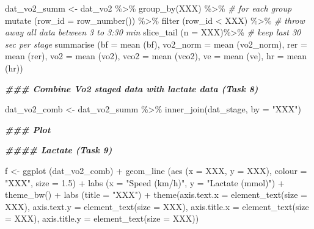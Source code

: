 \documentclass[
]{book}
\newenvironment{Shaded}{\begin{snugshade}}{\end{snugshade}}
\newcommand{\AttributeTok}[1]{\textcolor[rgb]{0.77,0.63,0.00}{#1}}
\newcommand{\CommentTok}[1]{\textcolor[rgb]{0.56,0.35,0.01}{\textit{#1}}}
\newcommand{\DocumentationTok}[1]{\textcolor[rgb]{0.56,0.35,0.01}{\textbf{\textit{#1}}}}
\newcommand{\FloatTok}[1]{\textcolor[rgb]{0.00,0.00,0.81}{#1}}
\newcommand{\FunctionTok}[1]{\textcolor[rgb]{0.00,0.00,0.00}{#1}}
\newcommand{\NormalTok}[1]{#1}
\newcommand{\OtherTok}[1]{\textcolor[rgb]{0.56,0.35,0.01}{#1}}
\newcommand{\SpecialCharTok}[1]{\textcolor[rgb]{0.00,0.00,0.00}{#1}}
\newcommand{\StringTok}[1]{\textcolor[rgb]{0.31,0.60,0.02}{#1}}
\begin{document}
\begin{Shaded}
\begin{Highlighting}[]
\NormalTok{dat\_vo2\_summ }\OtherTok{\textless{}{-}}\NormalTok{ dat\_vo2 }\SpecialCharTok{\%\textgreater{}\%}
  \FunctionTok{group\_by}\NormalTok{(XXX) }\SpecialCharTok{\%\textgreater{}\%} \CommentTok{\# for each group}
  \FunctionTok{mutate}\NormalTok{ (}\AttributeTok{row\_id =} \FunctionTok{row\_number}\NormalTok{()) }\SpecialCharTok{\%\textgreater{}\%}
  \FunctionTok{filter}\NormalTok{ (row\_id }\SpecialCharTok{\textless{}}\NormalTok{ XXX) }\SpecialCharTok{\%\textgreater{}\%} \CommentTok{\# throw away all data between 3 to 3:30 min}
  \FunctionTok{slice\_tail}\NormalTok{ (}\AttributeTok{n =}\NormalTok{ XXX)}\SpecialCharTok{\%\textgreater{}\%} \CommentTok{\# keep last 30 sec per stage}
  \FunctionTok{summarise}\NormalTok{ (}\AttributeTok{bf =} \FunctionTok{mean}\NormalTok{ (bf),}
             \AttributeTok{vo2\_norm =} \FunctionTok{mean}\NormalTok{ (vo2\_norm),}
             \AttributeTok{rer =} \FunctionTok{mean}\NormalTok{ (rer),}
             \AttributeTok{vo2 =} \FunctionTok{mean}\NormalTok{ (vo2),}
             \AttributeTok{vco2 =} \FunctionTok{mean}\NormalTok{ (vco2),}
             \AttributeTok{ve =} \FunctionTok{mean}\NormalTok{ (ve),}
             \AttributeTok{hr =} \FunctionTok{mean}\NormalTok{ (hr))}


\DocumentationTok{\#\#\# Combine Vo2 staged data with lactate data (Task 8)}

\NormalTok{dat\_vo2\_comb }\OtherTok{\textless{}{-}}\NormalTok{ dat\_vo2\_summ }\SpecialCharTok{\%\textgreater{}\%}
  \FunctionTok{inner\_join}\NormalTok{(dat\_stage, }\AttributeTok{by =} \StringTok{"XXX"}\NormalTok{)}

\DocumentationTok{\#\#\# Plot}

\DocumentationTok{\#\#\#\# Lactate (Task 9)}

\NormalTok{f }\OtherTok{\textless{}{-}} \FunctionTok{ggplot}\NormalTok{ (dat\_vo2\_comb) }\SpecialCharTok{+}
  \FunctionTok{geom\_line}\NormalTok{ (}\FunctionTok{aes}\NormalTok{ (}\AttributeTok{x =}\NormalTok{ XXX, }\AttributeTok{y =}\NormalTok{ XXX), }\AttributeTok{colour =} \StringTok{"XXX"}\NormalTok{, }\AttributeTok{size =} \FloatTok{1.5}\NormalTok{) }\SpecialCharTok{+} 
  \FunctionTok{labs}\NormalTok{ (}\AttributeTok{x =} \StringTok{"Speed (km/h)"}\NormalTok{,}
        \AttributeTok{y =} \StringTok{"Lactate (mmol)"}\NormalTok{) }\SpecialCharTok{+}
  \FunctionTok{theme\_bw}\NormalTok{() }\SpecialCharTok{+} 
  \FunctionTok{labs}\NormalTok{ (}\AttributeTok{title =} \StringTok{"XXX"}\NormalTok{) }\SpecialCharTok{+} 
  \FunctionTok{theme}\NormalTok{(}\AttributeTok{axis.text.x =} \FunctionTok{element\_text}\NormalTok{(}\AttributeTok{size =}\NormalTok{ XXX),}
        \AttributeTok{axis.text.y =} \FunctionTok{element\_text}\NormalTok{(}\AttributeTok{size =}\NormalTok{ XXX),  }
        \AttributeTok{axis.title.x =} \FunctionTok{element\_text}\NormalTok{(}\AttributeTok{size =}\NormalTok{ XXX),}
        \AttributeTok{axis.title.y =} \FunctionTok{element\_text}\NormalTok{(}\AttributeTok{size =}\NormalTok{ XXX))}


\end{Highlighting}
\end{Shaded}
\end{document}
